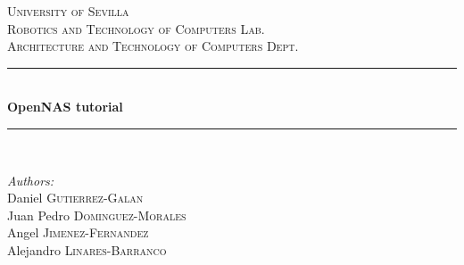 \begin{titlepage}

\newcommand{\HRule}{\rule{\linewidth}{0.5mm}} %

\center %
 
 

\textsc{\LARGE University of Sevilla}\\[1.5cm] %
\textsc{\Large Robotics and Technology of Computers Lab.}\\[0.5cm] %
\textsc{\large Architecture and Technology of Computers Dept.}\\[0.5cm] %

\HRule \\[0.4cm]
{ \huge \bfseries OpenNAS tutorial}\\[0.4cm] %
\HRule \\[1.5cm]
 

\begin{minipage}{0.6\textwidth}

\begin{flushleft} \large
\emph{Authors:}\\
Daniel \textsc{Gutierrez-Galan} \\ %
Juan Pedro \textsc{Dominguez-Morales} \\
Angel \textsc{Jimenez-Fernandez} \\
Alejandro \textsc{Linares-Barranco}
\end{flushleft}
\end{minipage}
~


\end{titlepage}
